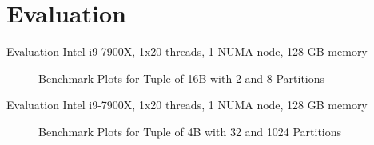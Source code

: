 \section{Evaluation}
\begin{frame}{Evaluation}
  Intel i9-7900X, 1x20 threads, 1 NUMA node, 128 GB memory

  \begin{figure}[h]
    \centering
    \begin{subfigure}{.49\textwidth}
      \centering
      \resizebox{\linewidth}{!}{}
    \end{subfigure}
    \begin{subfigure}{.49\textwidth}
      \centering
      \resizebox{\linewidth}{!}{}
    \end{subfigure}
    \begin{subfigure}{\textwidth}
      \centering
      \resizebox{.85\linewidth}{!}{}
    \end{subfigure}
    \caption[Shuffle Benchmark Plots for Tuple of 16B with 2 and 8 Partitions]{Benchmark Plots for Tuple of 16B with 2 and 8 Partitions}
    \label{plot-shuffle-16B-2-8}
  \end{figure}
\end{frame}

\begin{frame}{Evaluation}
  Intel i9-7900X, 1x20 threads, 1 NUMA node, 128 GB memory
  \begin{figure}[h]
    \centering
    \begin{subfigure}{.49\textwidth}
      \centering
      \resizebox{\linewidth}{!}{}
    \end{subfigure}
    \begin{subfigure}{.49\textwidth}
      \centering
      \resizebox{\linewidth}{!}{}
    \end{subfigure}
    \begin{subfigure}{\textwidth}
      \centering
      \resizebox{.85\linewidth}{!}{}
    \end{subfigure}
    \caption[Shuffle Benchmark Plots for Tuple of 4B with 32 and 1024 Partitions]{Benchmark Plots for Tuple of 4B with 32 and 1024 Partitions}
    \label{plot-shuffle-4B-32-1024}
  \end{figure}
\end{frame}

